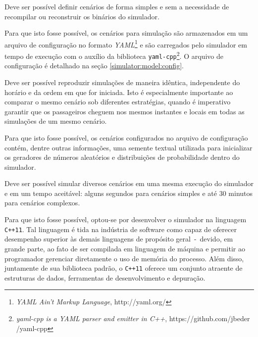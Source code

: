 \begin{description}[leftmargin=!,labelwidth=\widthof{\bfseries Determinístico}]

  \item[Configurável]

  Deve ser possível definir cenários de forma simples e sem a necessidade de
  recompilar ou reconstruir os binários do simulador.

  Para que isto fosse possível, os cenários para simulação são armazenados em um
  arquivo de configuração no formato \textit{YAML}\footnote{\textit{YAML Ain't
  Markup Language}, http://yaml.org/} e são carregados pelo simulador em tempo
  de execução com o auxílio da biblioteca \texttt{yaml-cpp}\footnote{\textit
  {yaml-cpp is a YAML parser and emitter in C++}, https://github.com/jbeder
  /yaml-cpp}. O arquivo de configuração é detalhado na seção
  \ref{simulator:model:config}.

  \item[Determinístico]

  Deve ser possível reproduzir simulações de maneira idêntica, independente do
  horário e da ordem em que for iniciada. Isto é especialmente importante ao
  comparar o mesmo cenário sob diferentes estratégias, quando é imperativo
  garantir que os passageiros cheguem nos mesmos instantes e locais em todas as
  simulações de um mesmo cenário.

  Para que isto fosse possível, os cenários configurados no arquivo de
  configuração contém, dentre outras informações, uma semente textual utilizada
  para inicializar os geradores de números aleatórios e distribuições de
  probabilidade dentro do simulador.

  \item[Escalável]

  Deve ser possível simular diversos cenários em uma mesma execução do simulador
  e em um tempo aceitável: alguns segundos para cenários simples e até 30
  minutos para cenários complexos.

  Para que isto fosse possível, optou-se por desenvolver o simulador na
  linguagem \texttt{C++11}. Tal linguagem é tida na indústria de software como
  capaz de oferecer desempenho superior às demais linguagens de propósito
  geral~-~devido, em grande parte, ao fato de ser compilada em linguagem de
  máquina e permitir ao programador gerenciar diretamente o uso de memória do
  processo. Além disso, juntamente de sua biblioteca padrão, o \texttt{C++11}
  oferece um conjunto atraente de estruturas de dados, ferramentas de
  desenvolvimento e depuração.


\end{description}
